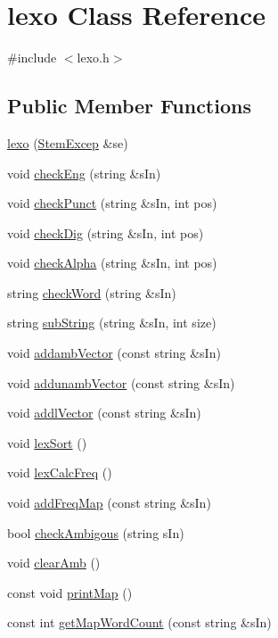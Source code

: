 \hypertarget{classlexo}{}\section{lexo Class Reference}
\label{classlexo}


{\ttfamily \#include $<$lexo.\+h$>$}

\subsection*{Public Member Functions}
\begin{DoxyCompactItemize}
\item 
\hyperlink{classlexo_a34ba088eb55d6f44c3fa0c02cf29c81d}{lexo} (\hyperlink{class_stem_excep}{Stem\+Excep} \&se)
\item 
void \hyperlink{classlexo_ac52caed43b8e4660b8dfe662648f16f0}{check\+Eng} (string \&s\+In)
\item 
void \hyperlink{classlexo_abc36453dc84f4ddb5f0aaaf6a59a7f56}{check\+Punct} (string \&s\+In, int pos)
\item 
void \hyperlink{classlexo_a5bbec0791966d024a09c6de4f12d278c}{check\+Dig} (string \&s\+In, int pos)
\item 
void \hyperlink{classlexo_a7ac14e81c979e5221ff0ecd1f418e7f7}{check\+Alpha} (string \&s\+In, int pos)
\item 
string \hyperlink{classlexo_a34c8664aad660450936c6fd3f7b235b0}{check\+Word} (string \&s\+In)
\item 
string \hyperlink{classlexo_a0e0470fe5a129ab3368044af5c48fc66}{sub\+String} (string \&s\+In, int size)
\item 
void \hyperlink{classlexo_a76321bcd5e6510b0c29f7c420de9e211}{addamb\+Vector} (const string \&s\+In)
\item 
void \hyperlink{classlexo_aa22bedaba538d542d58d5cb78c55219b}{addunamb\+Vector} (const string \&s\+In)
\item 
void \hyperlink{classlexo_a3d857c46564021e8184fa120f219a29a}{addl\+Vector} (const string \&s\+In)
\item 
void \hyperlink{classlexo_ac8001ad317bfa10094990fc5d8c6ae10}{lex\+Sort} ()
\item 
void \hyperlink{classlexo_a17c552c5bd0d48a836711dc0716e79ee}{lex\+Calc\+Freq} ()
\item 
void \hyperlink{classlexo_a2f58dbc91b5038e59c0409139b3de22f}{add\+Freq\+Map} (const string \&s\+In)
\item 
bool \hyperlink{classlexo_ab8a61fb14f89b9e1c5e181f72d734af5}{check\+Ambigous} (string s\+In)
\item 
void \hyperlink{classlexo_a90e76d7e93c55b874f92d35375a7b9e6}{clear\+Amb} ()
\item 
const void \hyperlink{classlexo_af37343d245d4ca3d53e100cdf9f5ec02}{print\+Map} ()
\item 
const int \hyperlink{classlexo_a8d65ae4edf561a3e402197163a7f8ebb}{get\+Map\+Word\+Count} (const string \&s\+In)
\end{DoxyCompactItemize}
